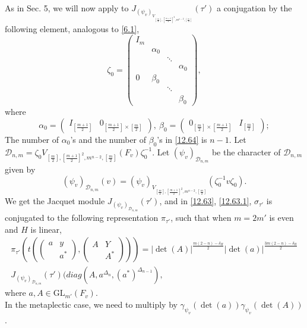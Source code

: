 \documentclass[12pts]{amsart}
\newcommand{\GL}{{\mathrm{GL}}}
\begin{document}
As in Sec. 5, we will now apply to $J_{(\psi_v)_{V_{[\frac{m}{2}],[\frac{m+1}{2}]^2,m^{n-2},[\frac{m}{2}]}}}(\tau')$ a conjugation by the following element, analogous to \eqref{6.1},
\begin{equation}\label{12.64}
\zeta_0=\begin{pmatrix}I_m\\&\alpha_0\\&&\ddots\\&&&\alpha_0\\0&\beta_0\\&&\ddots\\&&&\beta_0\end{pmatrix},
\end{equation}
where 
$$
\alpha_0=\begin{pmatrix}I_{[\frac{m+1}{2}]}&0_{[\frac{m+1}{2}]\times [\frac{m}{2}]}\end{pmatrix},\
\beta_0=\begin{pmatrix}0_{[\frac{m}{2}]\times [\frac{m+1}{2}]}&I_{[\frac{m}{2}]}\end{pmatrix};
$$
The number of $\alpha_0$'s and the number of $\beta_0$'s in \eqref{12.64} is $n-1$. Let\\ $\mathcal{D}_{n,m}=\zeta_0V_{[\frac{m}{2}],[\frac{m+1}{2}]^2,m^{n-2},[\frac{m}{2}]}(F_v)\zeta_0^{-1}$. Let $(\psi_v)_{\mathcal{D}_{n,m}}$ be the character of $\mathcal{D}_{n,m}$ given by
$$
(\psi_v)_{\mathcal{D}_{n,m}}(v)=(\psi_v)_{V_{[\frac{m}{2}],[\frac{m+1}{2}]^2,m^{n-2},[\frac{m}{2}]}}(\zeta_0^{-1}v\zeta_0).
$$
We get the Jacquet module $J_{(\psi_v)_{\mathcal{D}_{n,m}}}(\tau')$, and in \eqref{12.63}, \eqref{12.63.1}, $\sigma_{\tau'}$ is conjugated to the following representation $\pi_{\tau'}$, such that  when $m=2m'$ is even and $H$ is linear,
\begin{multline}\label{12.64.1}
\pi_{\tau'}(t(\begin{pmatrix}a&y\\&a^*\end{pmatrix}, \begin{pmatrix}A&Y\\&A^*\end{pmatrix}))=|\det(A)|^{\frac{m(2-n)-\delta_H}{2}}|\det(a)|^{\frac{3m(2-n)-\delta_H}{2}}\\
J_{(\psi_v)_{\mathcal{D}_{n,m}}}(\tau')(diag( A,a^{\Delta_n},(a^*)^{\Delta_{n-1}}),
\end{multline}
where $a, A\in \GL_{m'}(F_v)$.\\
In the metaplectic case, we need to multiply by $\gamma_{\psi_v}(\det(a))\gamma_{\psi_v}(\det(A))$.
\end{document}
